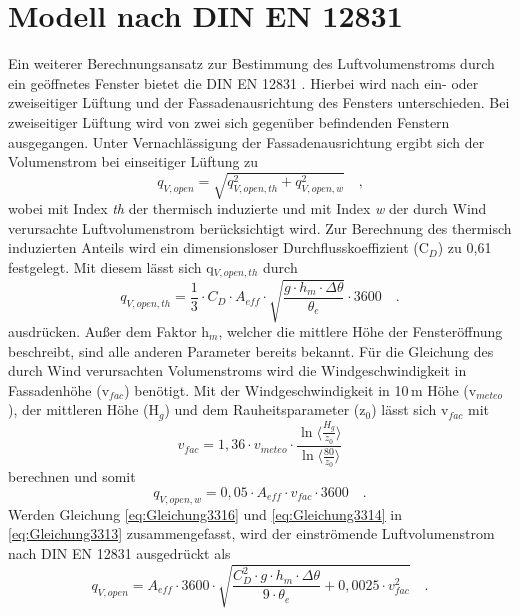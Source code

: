 \section*{Modell nach DIN EN 12831}
Ein weiterer Berechnungsansatz zur Bestimmung des Luftvolumenstroms durch ein geöffnetes Fenster bietet die DIN EN 12831 \cite{DINDeutschesInstitutfurNormunge.V..September2017}.
Hierbei wird nach ein- oder zweiseitiger Lüftung und der Fassadenausrichtung des Fensters unterschieden.
Bei zweiseitiger Lüftung wird von zwei sich gegenüber befindenden Fenstern ausgegangen.
Unter Vernachlässigung der Fassadenausrichtung ergibt sich der Volumenstrom bei einseitiger Lüftung zu
\begin{equation}
\label{eq:Gleichung3313}
q_{V,open} = \sqrt{q_{V,open,th}^2 + q_{V,open,w}^2}\quad\text{,}
\end{equation}
wobei mit Index \textit{th} der thermisch induzierte und mit Index \textit{w} der durch Wind verursachte Luftvolumenstrom berücksichtigt wird.
Zur Berechnung des thermisch induzierten Anteils wird ein dimensionsloser Durchflusskoeffizient (C\(_D\)) zu 0,61 festgelegt.
Mit diesem lässt sich q\(_{V,open,th}\) durch
\begin{equation}
\label{eq:Gleichung3314}
q_{V,open,th} = \frac{1}{3} \cdot C_D \cdot A_{eff} \cdot \sqrt{\frac{g \cdot h_m \cdot \Delta \theta}{\theta_e}} \cdot 3600 \quad\text{.}
\end{equation}
ausdrücken.
Außer dem Faktor h\(_m\), welcher die mittlere Höhe der Fensteröffnung beschreibt, sind alle anderen Parameter bereits bekannt.
Für die Gleichung des durch Wind verursachten Volumenstroms wird die Windgeschwindigkeit in Fassadenhöhe (v\(_{fac}\)) benötigt.
Mit der Windgeschwindigkeit in 10\,m Höhe (v\(_{meteo}\)), der mittleren Höhe (H\(_g\)) und dem Rauheitsparameter (z\(_0\)) lässt sich v\(_{fac}\) mit
\begin{equation}
\label{eq:Gleichung3315}
v_{fac} = 1,36 \cdot v_{meteo} \cdot \frac{\ln{\biggl\langle\frac{H_g}{z_0}\biggr\rangle}}{\ln{\biggl\langle\frac{80}{z_0}\biggr\rangle}}
\end{equation}
berechnen und somit 
\begin{equation}
\label{eq:Gleichung3316}
q_{V,open,w} = 0,05 \cdot A_{eff} \cdot v_{fac} \cdot 3600 \quad \text{.}
\end{equation}
Werden Gleichung \ref{eq:Gleichung3316} und \ref{eq:Gleichung3314} in \ref{eq:Gleichung3313} zusammengefasst, wird der einströmende Luftvolumenstrom nach DIN EN 12831 ausgedrückt als
\begin{equation}
\label{eq:Gleichung3317}
q_{V,open} = A_{eff} \cdot 3600 \cdot \sqrt{\frac{C_{D}^2 \cdot g \cdot h_m \cdot \Delta \theta}{9 \cdot \theta_e} + 0,0025 \cdot v_{fac}^2} \quad \text{.}
\end{equation}
